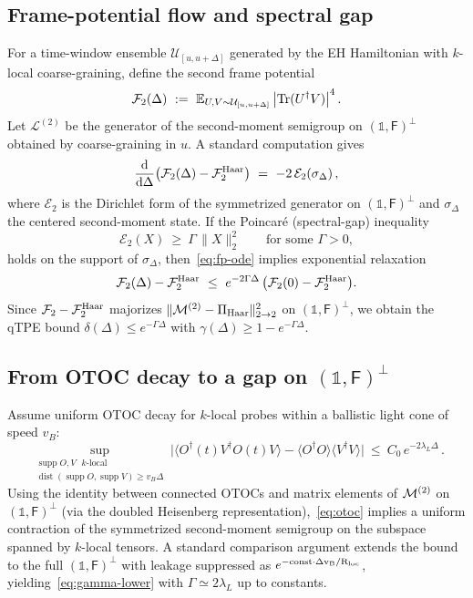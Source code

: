 \subsection{Frame-potential flow and spectral gap}\label{app:fp-flow}
For a time-window ensemble $\mathcal{U}_{[u,u+\Delta]}$ generated by the EH Hamiltonian with $k$-local coarse-graining, define the second frame potential
\[
\FP_2(\Delta)\ :=\ \mathbb{E}_{U,V\sim\mathcal{U}_{[u,u+\Delta]}}\left|\operatorname{Tr}(U^\dagger V)\right|^4.
\]
Let $\mathcal{L}^{(2)}$ be the generator of the second-moment semigroup on $(\mathbb{1},\mathsf{F})^\perp$ obtained by coarse-graining in $u$. A standard computation gives
\begin{equation}\label{eq:fp-ode}
\frac{\mathrm{d}}{\mathrm{d}\Delta}\big(\mathcal{F}_2(\Delta)-\mathcal{F}^{\rm Haar}_2\big)\ =\ -2\,\mathcal{E}_2\!\left(\sigma_\Delta\right),
\end{equation}
where $\mathcal{E}_2$ is the Dirichlet form of the symmetrized generator on $(\mathbb{1},\mathsf{F})^\perp$ and $\sigma_\Delta$ the centered second-moment state. If the Poincar\'e (spectral-gap) inequality
\begin{equation}\label{eq:poincare}
\mathcal{E}_2(X)\ \ge\ \Gamma\,\|X\|_2^2\qquad\text{for some }\Gamma>0,
\end{equation}
holds on the support of $\sigma_\Delta$, then~\eqref{eq:fp-ode} implies exponential relaxation
\[
\FP_2(\Delta)-\FP^{\rm Haar}_2\ \le\ e^{-2\Gamma\Delta}\,\big(\FP_2(0)-\FP^{\rm Haar}_2\big).
\]
Since $\mathcal{F}_2-\mathcal{F}^{\rm Haar}_2$ majorizes $\|\mathcal{M}^{(2)}-\Pi_{\rm Haar}\|_{2\to 2}^2$ on $(\mathbb{1},\mathsf{F})^\perp$, we obtain the qTPE bound $\delta(\Delta)\le e^{-\Gamma\Delta}$ with $\gamma(\Delta)\ge 1-e^{-\Gamma\Delta}$.

\subsection{From OTOC decay to a gap on $(\mathbb{1},\mathsf{F})^\perp$}\label{app:chaos-gap}
Assume uniform OTOC decay for $k$-local probes within a ballistic light cone of speed $v_B$:
\begin{equation}\label{eq:otoc}
\sup_{\substack{\operatorname{supp}O,V\text{ $k$-local}\\ \operatorname{dist}(\operatorname{supp}O,\operatorname{supp}V)\ge v_B\Delta}}\Big|\langle O^\dagger(t) V^\dagger O(t)V\rangle - \langle O^\dagger O\rangle\langle V^\dagger V\rangle\Big|
\ \le\ C_0\,e^{-2\lambda_L\Delta}\,.
\end{equation}
Using the identity between connected OTOCs and matrix elements of $\mathcal{M}^{(2)}$ on $(\mathbb{1},\mathsf{F})^\perp$ (via the doubled Heisenberg representation),~\eqref{eq:otoc} implies a uniform contraction of the symmetrized second-moment semigroup on the subspace spanned by $k$-local tensors. A standard comparison argument extends the bound to the full $(\mathbb{1},\mathsf{F})^\perp$ with leakage suppressed as $e^{-\rm const\cdot \Delta v_B/R_{\rm loc}}$, yielding~\eqref{eq:gamma-lower} with $\Gamma\simeq 2\lambda_L$ up to constants.

